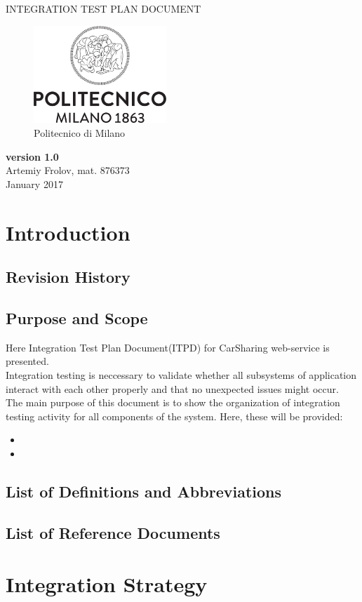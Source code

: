 \documentclass[12pt, letterpaper]{article}
\begin{document}
\begin{titlepage}
\centering
{\Large INTEGRATION TEST PLAN DOCUMENT} \\
\begin{figure}[H]
\centering
\includegraphics[width=5cm]{Logo_Politecnico_Milano.png}
\caption{Politecnico di Milano}
\label{fig:PoliMi}
\end{figure}
\textbf{version 1.0} \\
\bigskip
Artemiy Frolov, mat. 876373 \\
\bigskip
January 2017
\end{titlepage}


\tableofcontents{}

\newpage

\section{Introduction}
\subsection{Revision History}


\subsection{Purpose and Scope}

Here Integration Test Plan Document(ITPD) for CarSharing web-service is presented.  \\
Integration testing is neccessary to validate whether all subsystems of application interact with each other properly and that no unexpected issues might occur. \\
The main purpose of this document is to show the organization of integration testing activity for all components of the system.
Here, these will be provided:
\begin{itemize}
	\item 
	\item

\end{itemize}         




\subsection{List of Definitions and Abbreviations}






\subsection{List of Reference Documents}

% 
\section{Integration Strategy}
\end{document}
